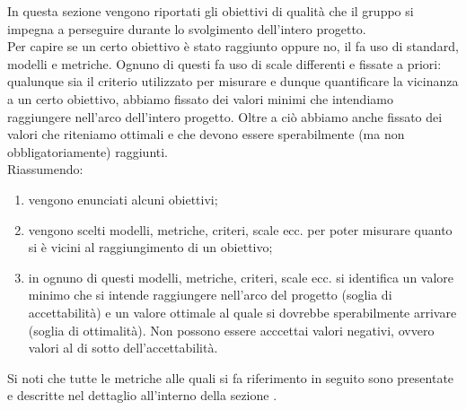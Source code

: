 		In questa sezione vengono riportati gli obiettivi di qualità che il gruppo \groupname{} si impegna a perseguire durante lo svolgimento dell'intero progetto.\\
		Per capire se un certo obiettivo è stato raggiunto oppure no, il \groupname{} fa uso di standard, modelli e metriche. Ognuno di questi fa uso di scale differenti e fissate a priori: qualunque sia il criterio utilizzato per misurare e dunque quantificare la vicinanza a un certo obiettivo, abbiamo fissato dei valori minimi che intendiamo raggiungere nell'arco dell'intero progetto. Oltre a ciò abbiamo anche fissato dei valori che riteniamo ottimali e che devono essere sperabilmente (ma non obbligatoriamente) raggiunti.\\
		Riassumendo:
		\begin{enumerate}
			\item vengono enunciati alcuni obiettivi;
			\item vengono scelti modelli, metriche, criteri, scale ecc. per poter misurare quanto si è vicini al raggiungimento di un obiettivo;
			\item in ognuno di questi modelli, metriche, criteri, scale ecc. si identifica un valore minimo che si intende raggiungere nell'arco del progetto (soglia di accettabilità) e un valore ottimale al quale si dovrebbe sperabilmente arrivare (soglia di ottimalità). Non possono essere acccettai valori negativi, ovvero valori al di sotto dell'accettabilità. 
		\end{enumerate}
		Si noti che tutte le metriche alle quali si fa riferimento in seguito sono presentate e descritte nel dettaglio all'interno della sezione .

